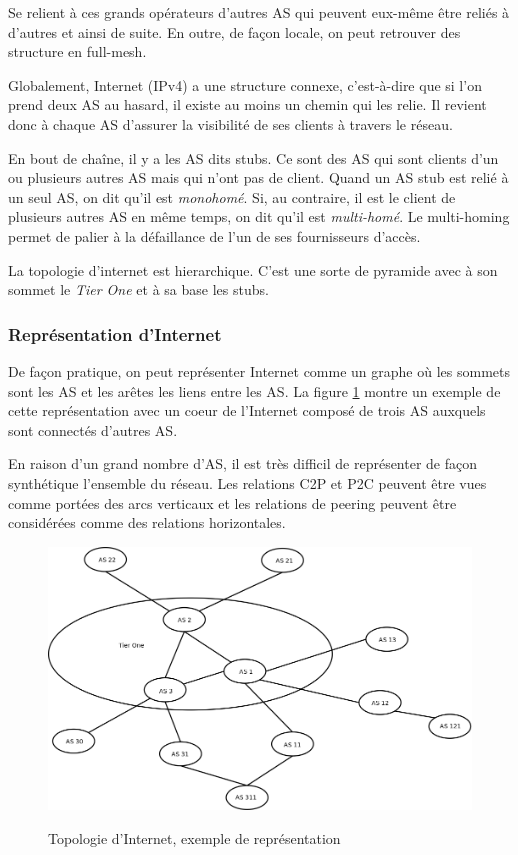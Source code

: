 \par
Se relient \`a ces grands op\'erateurs d'autres AS qui peuvent eux-m\^eme \^etre reli\'es \`a d'autres et ainsi de suite. En outre, de fa\c con locale, on peut retrouver des structure en full-mesh.
\par
Globalement, Internet (IPv4) a une structure connexe, c'est-\`a-dire que si l'on prend deux AS au hasard, il existe au moins un chemin qui les relie. Il revient donc \`a chaque AS d'assurer la visibilit\'e de ses clients \`a travers le r\'eseau.
\par
En bout de cha\^ine, il y a les AS dits stubs. Ce sont des AS qui sont clients d'un ou plusieurs autres AS mais qui n'ont pas de client. Quand un AS stub est reli\'e \`a un seul AS, on dit qu'il est \textit{monohom\'e}. Si, au contraire, il est le client de plusieurs autres AS en m\^eme temps, on dit qu'il est \textit{multi-hom\'e}. Le multi-homing permet de palier à la défaillance de l'un de ses fournisseurs d'accès.
\par
La topologie d'internet est hierarchique. C'est une sorte de pyramide avec à son sommet le \textit{Tier One} et à sa base les stubs.

\subsubsection{Repr\'esentation d'Internet}
\par
De fa\c con pratique, on peut repr\'esenter Internet comme un graphe o\`u les sommets sont les AS et les ar\^etes les liens entre les AS. La figure \ref{topologie} montre un exemple de cette repr\'esentation avec un coeur de l'Internet compos\'e de trois AS auxquels sont connect\'es d'autres AS.
\par
En raison d'un grand nombre d'AS, il est tr\`es difficil de repr\'esenter de fa\c con synth\'etique l'ensemble du r\'eseau. Les relations C2P et P2C peuvent \^etre vues comme port\'ees des arcs verticaux et les relations de peering peuvent \^etre consid\'er\'ees comme des relations horizontales.

\begin{figure}[H]
\centering
 \fbox
 {
 \includegraphics[width=16cm]{./schema/topologie_internet.png}
 }
  \caption{\label{topologie}Topologie d'Internet, exemple de repr\'esentation}
\end{figure}



%
